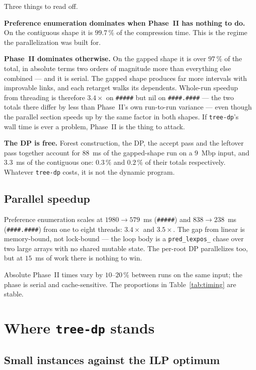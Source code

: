 \documentclass[11pt,a4paper]{article}
\theoremstyle{definition}
\theoremstyle{plain}
\theoremstyle{remark}
\begin{document}
Three things to read off.

\textbf{Preference enumeration dominates when Phase~II has nothing to
do.} On the contiguous shape it is $99.7\,\%$ of the compression time.
This is the regime the parallelization was built for.

\textbf{Phase~II dominates otherwise.} On the gapped shape it is over
$97\,\%$ of the total, in absolute terms two orders of magnitude more
than everything else combined --- and it is serial. The gapped shape
produces far more intervals with improvable links, and each retarget
walks its dependents. Whole-run speedup from threading is therefore
$3.4\times$ on \texttt{\#\#\#\#\#} but nil on
\texttt{\#\#\#\#.\#\#\#\#} --- the two totals there differ by less than
Phase~II's own run-to-run variance --- even though the parallel section
speeds up by the same factor in both shapes. If \texttt{tree-dp}'s wall
time is ever a problem, Phase~II is the thing to attack.

\textbf{The DP is free.} Forest construction, the DP, the accept pass
and the leftover pass together account for $88$~ms of the gapped-shape
run on a $9$~Mbp input, and $3.3$~ms of the contiguous one: $0.3\,\%$
and $0.2\,\%$ of their totals respectively. Whatever \texttt{tree-dp}
costs, it is not the dynamic program.

\subsection{Parallel speedup}

Preference enumeration scales at $1980 \to 579$~ms
(\texttt{\#\#\#\#\#}) and $838 \to 238$~ms (\texttt{\#\#\#\#.\#\#\#\#})
from one to eight threads: $3.4\times$ and $3.5\times$. The gap from
linear is memory-bound, not lock-bound --- the loop body is a
\texttt{pred\_lexpos\_} chase over two large arrays with no shared
mutable state. The per-root DP parallelizes too, but at $15$~ms of work
there is nothing to win.

Absolute Phase~II times vary by $10$--$20\,\%$ between runs on the same
input; the phase is serial and cache-sensitive. The proportions in
Table~\ref{tab:timing} are stable.

\section{Where \texttt{tree-dp} stands}
\label{sec:empirical}

\subsection{Small instances against the ILP optimum}
\end{document}
